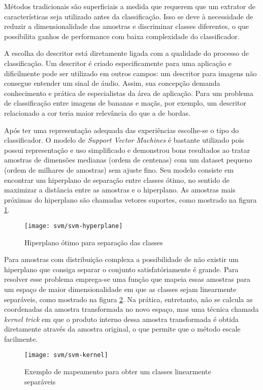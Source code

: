 Métodos tradicionais são superficiais a medida que requerem que um extrator de características seja utilizado antes da classificação. Isso se deve à necessidade de reduzir a dimensionalidade das amostras e discriminar classes diferentes, o que possibilita ganhos de performance com baixa complexidade do classificador.

A escolha do descritor está diretamente ligada com a qualidade do processo de classificação. Um descritor é criado especificamente para uma aplicação e dificilmente pode ser utilizado em outros campos: um descritor para imagens não consegue entender um sinal de áudio. Assim, sua concepção demanda conhecimento e prática de especialistas da área de aplicação. Para um problema de classificação entre imagens de bananas e maçãs, por exemplo, um descritor relacionado a cor teria maior relevância do que a de bordas.

Após ter uma representação adequada das experiências escolhe-se o tipo do classificador. O modelo de \textit{Support Vector Machines} é bastante utilizado pois possui representação e uso simplificado e demonstrou bons resultados ao tratar amostras de dimensões medianas (ordem de centenas) com um dataset pequeno (ordem de milhares de amostras) sem ajuste fino. Seu modelo consiste em encontrar um hiperplano de separação entre classes ótimo, no sentido de maximizar a distância entre as amostras e o hiperplano. As amostras mais próximas do hiperplano são chamadas vetores suportes, como mostrado na figura \ref{fig:svm-hyperplane}.

\begin{figure}[h]
\caption{Hiperplano ótimo para separação das classes}
\centering
\texttt{[image: svm/svm-hyperplane]}
\label{fig:svm-hyperplane}
\end{figure}

Para amostras com distribuição complexa a possibilidade de não existir um hiperplano que consiga separar o conjunto satisfatóriamente é grande. Para resolver esse problema emprega-se uma função que mapeia essas amostras para um espaço de maior dimensionalidade em que as classes sejam linearmente separáveis, como mostrado na figura \ref{fig:svm-kernel}. Na prática, entretanto, não se calcula as coordenadas da amostra transformada no novo espaço, mas uma técnica chamada \textit{kernel trick} em que o produto interno dessa amostra transformada é obtida diretamente através da amostra original, o que permite que o método escale facilmente.

\begin{figure}[h]
\caption{Exemplo de mapeamento para obter um classes linearmente separáveis}
\centering
\texttt{[image: svm/svm-kernel]}
\label{fig:svm-kernel}
\end{figure}

